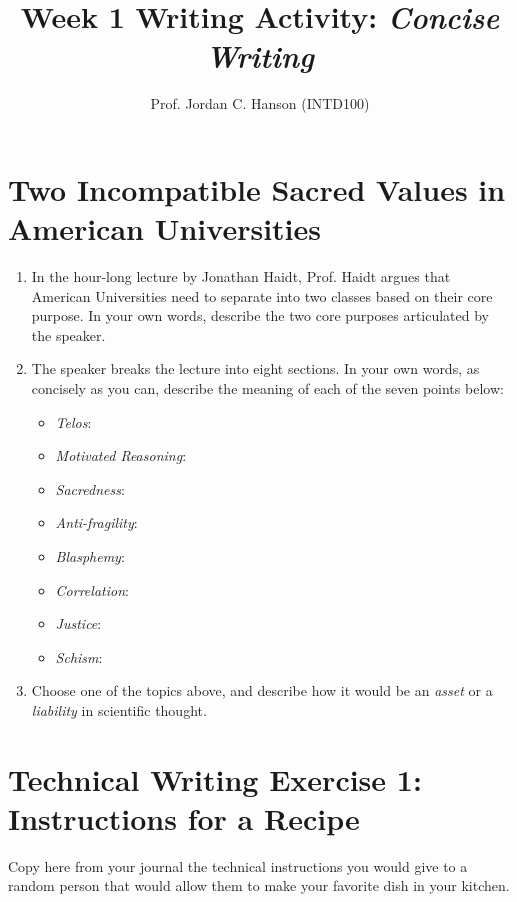 \documentclass{article}
\begin{document}
\title{Week 1 Writing Activity: \textit{Concise Writing}}
\author{Prof. Jordan C. Hanson (INTD100)}

\maketitle

\section{Two Incompatible Sacred Values in American Universities}

\begin{enumerate}
\item In the hour-long lecture by Jonathan Haidt, Prof. Haidt argues that American Universities need to separate into two classes based on their core purpose.  In your own words, describe the two core purposes articulated by the speaker.
\\
\vspace{2cm}
\item The speaker breaks the lecture into eight sections.  In your own words, as concisely as you can, describe the meaning of each of the seven points below:
\begin{itemize}
\item \textit{Telos}: 
\item \textit{Motivated Reasoning}: 
\item \textit{Sacredness}: 
\item \textit{Anti-fragility}: 
\item \textit{Blasphemy}: 
\item \textit{Correlation}: 
\item \textit{Justice}: 
\item \textit{Schism}: 
\end{itemize}
\item Choose one of the topics above, and describe how it would be an \textit{asset} or a \textit{liability} in scientific thought. \\ \vspace{1cm}
\end{enumerate}

\section{Technical Writing Exercise 1: Instructions for a Recipe}

Copy here from your journal the technical instructions you would give to a random person that would allow them to make your favorite dish in your kitchen.
\end{document}
